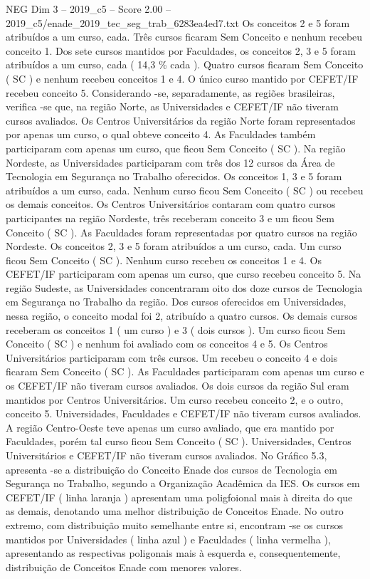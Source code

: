\begin{textsample}{NEG Dim 3 – 2019\_c5 – Score 2.00 – 2019\_c5/enade\_2019\_tec\_seg\_trab\_6283ea4ed7.txt}
Os conceitos 2 e 5 foram atribuídos a um curso, cada.
Três cursos ficaram Sem Conceito e nenhum recebeu conceito 1.
Dos sete cursos mantidos por Faculdades, os conceitos 2, 3 e 5 foram atribuídos a um curso, cada ( 14,3 \% cada ).
Quatro cursos ficaram Sem Conceito ( SC ) e nenhum recebeu conceitos 1 e 4.
O único curso mantido por CEFET/IF recebeu conceito 5.
Considerando -se, separadamente, as regiões brasileiras, verifica -se que, na região Norte, as Universidades e CEFET/IF não tiveram cursos avaliados.
Os Centros Universitários da região Norte foram representados por apenas um curso, o qual obteve conceito 4.
As Faculdades também participaram com apenas um curso, que ficou Sem Conceito ( SC ).
Na região Nordeste, as Universidades participaram com três dos 12 cursos da Área de Tecnologia em Segurança no Trabalho oferecidos.
Os conceitos 1, 3 e 5 foram atribuídos a um curso, cada.
Nenhum curso ficou Sem Conceito ( SC ) ou recebeu os demais conceitos.
Os Centros Universitários contaram com quatro cursos participantes na região Nordeste, três receberam conceito 3 e um ficou Sem Conceito ( SC ).
As Faculdades foram representadas por quatro cursos na região Nordeste.
Os conceitos 2, 3 e 5 foram atribuídos a um curso, cada.
Um curso ficou Sem Conceito ( SC ).
Nenhum curso recebeu os conceitos 1 e 4.
Os CEFET/IF participaram com apenas um curso, que curso recebeu conceito 5.
Na região Sudeste, as Universidades concentraram oito dos doze cursos de Tecnologia em Segurança no Trabalho da região.
Dos cursos oferecidos em Universidades, nessa região, o conceito modal foi 2, atribuído a quatro cursos.
Os demais cursos receberam os conceitos 1 ( um curso ) e 3 ( dois cursos ).
Um curso ficou Sem Conceito ( SC ) e nenhum foi avaliado com os conceitos 4 e 5.
Os Centros Universitários participaram com três cursos.
Um recebeu o conceito 4 e dois ficaram Sem Conceito ( SC ).
As Faculdades participaram com apenas um curso e os CEFET/IF não tiveram cursos avaliados.
Os dois cursos da região Sul eram mantidos por Centros Universitários.
Um curso recebeu conceito 2, e o outro, conceito 5.
Universidades, Faculdades e CEFET/IF não tiveram cursos avaliados.
A região Centro-Oeste teve apenas um curso avaliado, que era mantido por Faculdades, porém tal curso ficou Sem Conceito ( SC ).
Universidades, Centros Universitários e CEFET/IF não tiveram cursos avaliados.
No Gráfico 5.3, apresenta -se a distribuição do Conceito Enade dos cursos de Tecnologia em Segurança no Trabalho, segundo a Organização Acadêmica da IES.
Os cursos em CEFET/IF ( linha laranja ) apresentam uma poligfoional mais à direita do que as demais, denotando uma melhor distribuição de Conceitos Enade.
No outro extremo, com distribuição muito semelhante entre si, encontram -se os cursos mantidos por Universidades ( linha azul ) e Faculdades ( linha vermelha ), apresentando as respectivas poligonais mais à esquerda e, consequentemente, distribuição de Conceitos Enade com menores valores.

\end{textsample}
